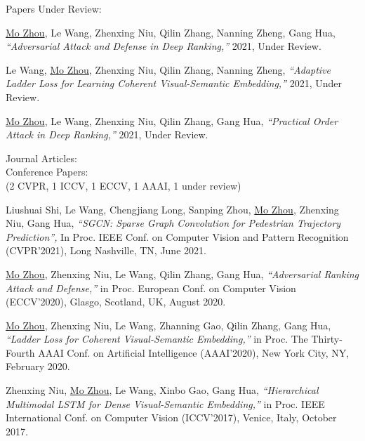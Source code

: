 \documentclass[margin,line,pifont,palatino,courier]{res}
\begin{document}
\begin{resume}
	{\sc Papers Under Review:}\\

\begin{enumerate}[noitemsep, leftmargin=*, label={[J0{\arabic*}]}]

\item \underline{Mo Zhou}, Le Wang, Zhenxing Niu, Qilin Zhang, Nanning Zheng, Gang Hua,
\textit{``Adversarial Attack and Defense in Deep Ranking,''}
2021, Under Review.

\item Le Wang, \underline{Mo Zhou}, Zhenxing Niu, Qilin Zhang, Nanning Zheng,
\textit{``Adaptive Ladder Loss for Learning Coherent Visual-Semantic Embedding,''}
2021, Under Review.

\item \underline{Mo Zhou}, Le Wang, Zhenxing Niu, Qilin Zhang, Gang Hua,
\textit{``Practical Order Attack in Deep Ranking,''}
2021, Under Review.

\end{enumerate}

	{\sc Journal Articles:}\\

	{\sc Conference Papers:}\\
	(2 CVPR, 1 ICCV, 1 ECCV, 1 AAAI, 1 under review)

\begin{enumerate}[noitemsep, leftmargin=*, label={[C0{\arabic*}]}]

\item Liushuai Shi, Le Wang, Chengjiang Long, Sanping Zhou, \underline{Mo Zhou}, Zhenxing Niu, Gang Hua,
\textit{``SGCN: Sparse Graph Convolution for Pedestrian Trajectory Prediction'',}
In Proc. IEEE Conf. on Computer Vision and Pattern Recognition (CVPR'2021),
Long Nashville, TN, June 2021.

\item \underline{Mo Zhou}, Zhenxing Niu, Le Wang, Qilin Zhang, Gang Hua,
\textit{``Adversarial Ranking Attack and Defense,''}
in Proc. European Conf. on Computer Vision (ECCV'2020),
Glasgo, Scotland, UK, August 2020.

\item  \underline{Mo Zhou}, Zhenxing Niu, Le Wang, Zhanning Gao, Qilin Zhang, Gang Hua,
\textit{``Ladder Loss for Coherent Visual-Semantic Embedding,''}
in Proc. The Thirty-Fourth AAAI Conf. on Artificial Intelligence (AAAI'2020),
New York City, NY, February 2020.

\item Zhenxing Niu, \underline{Mo Zhou}, Le Wang, Xinbo Gao, Gang Hua,
\textit{``Hierarchical Multimodal LSTM for Dense Visual-Semantic Embedding,''}
in Proc. IEEE International Conf. on Computer Vision (ICCV'2017),
Venice, Italy, October 2017.


\end{enumerate}
\end{resume}
\end{document}
